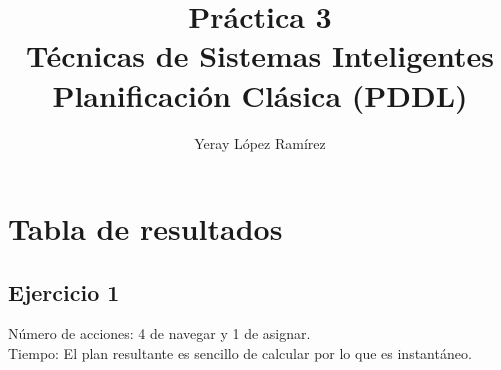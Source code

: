

\title{
	Práctica 3 \\\vspace{1cm}
	Técnicas de Sistemas Inteligentes \vspace{1cm} \\
	Planificación Clásica (PDDL) \vspace{1cm} \\
 }   

\author{Yeray López Ramírez	}                             

\renewcommand*\contentsname{hola}

\makeatletter
\let\thetitle\@title
\let\theauthor\@author
\let\thedate\@date
\makeatother





\newpage %
\newcommand{\code}[1]{\colorbox{light-gray}{\textcolor{alizarin}{\texttt{#1}}}}
\newcommand{\high}[1]{\colorbox{light-gray}{\textcolor{nyellow}{\texttt{#1}}}}

\tableofcontents %

\listoftables

\newpage


\section{Tabla de resultados}
\subsection{Ejercicio 1}
\noindent{}


Número de acciones: 4 de navegar y 1 de asignar.\\
Tiempo: El plan resultante es sencillo de calcular por lo que es instantáneo.

